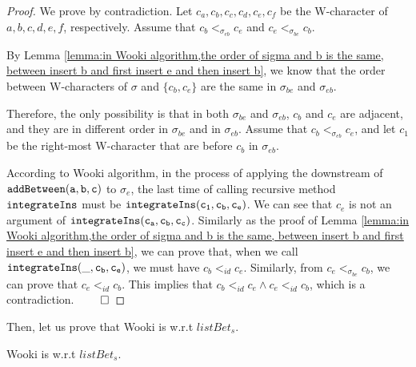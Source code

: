 \begin {proof}
We prove by contradiction. Let $c_a,c_b,c_c,c_d,c_e,c_f$ be the W-character of $a,b,c,d,e,f$, respectively. Assume that $c_b <_{\sigma_{eb}} c_e$ and $c_e <_{\sigma_{be}} c_b$.

By Lemma \ref{lemma:in Wooki algorithm,the order of sigma and b is the same, between insert b and first insert e and then insert b}, we know that the order between W-characters of $\sigma$ and $\{ c_b,c_e \}$ are the same in $\sigma_{be}$ and $\sigma_{eb}$.

Therefore, the only possibility is that in both $\sigma_{be}$ and $\sigma_{eb}$, $c_b$ and $c_e$ are adjacent, and they are in different order in $\sigma_{be}$ and in $\sigma_{eb}$. Assume that $c_b <_{\sigma_{eb}} c_e$, and let $c_1$ be the right-most W-character that are before $c_b$ in $\sigma_{eb}$.

According to Wooki algorithm, in the process of applying the downstream of $\alabelshort[{\tt addBetween}]{a,b,c}$ to $\sigma_e$, the last time of calling recursive method ${\tt integrateIns}$ must be $\alabelshort[{\tt integrateIns}]{c_1,c_b,c_e}$. %
We can see that $c_e$ is not an argument of $\alabelshort[{\tt integrateIns}]{c_a,c_b,c_c}$. Similarly as the proof of Lemma \ref{lemma:in Wooki algorithm,the order of sigma and b is the same, between insert b and first insert e and then insert b}, we can prove that, when we call $\alabelshort[{\tt integrateIns}]{\_,c_b,c_e}$, we must have $c_b <_{id} c_e$. Similarly, from $c_e <_{\sigma_{be}} c_b$, we can prove that $c_e <_{id} c_b$. This implies that $c_b <_{id} c_e \wedge c_e <_{id} c_b$, which is a contradiction. $\qed$
\end {proof}



Then, let us prove that Wooki is \crdtlinearizable{} w.r.t $\mathit{listBet}_s$.

\begin{lemma}
\label{lemma:Wooki is correct}
Wooki is \crdtlinearizable{} w.r.t $\mathit{listBet}_s$.
\end{lemma}

